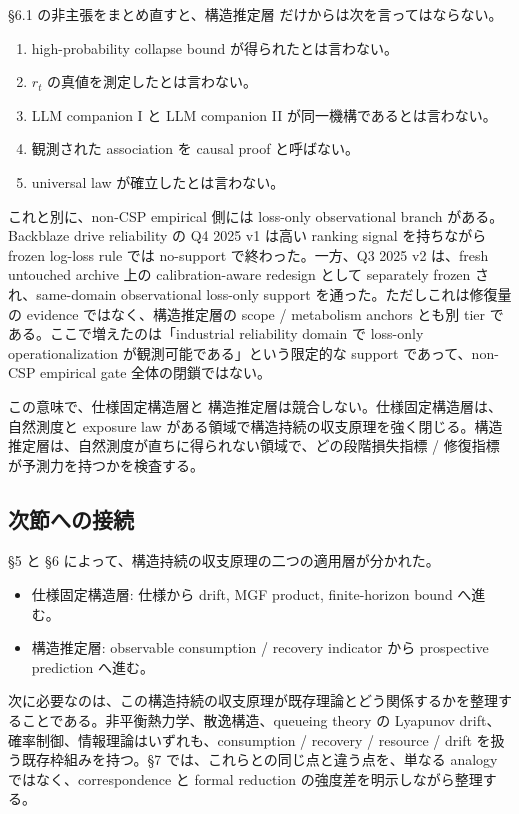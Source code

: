 \documentclass[12pt,a4paper]{article}
\begin{document}
§6.1 の非主張をまとめ直すと、構造推定層 だけからは次を言ってはならない。

\begin{enumerate}
\def\labelenumi{\arabic{enumi}.}
\tightlist
\item
  high-probability collapse bound が得られたとは言わない。
\item
  \(r_{t}\) の真値を測定したとは言わない。
\item
  LLM companion I と LLM companion II が同一機構であるとは言わない。
\item
  観測された association を causal proof と呼ばない。
\item
  universal law が確立したとは言わない。
\end{enumerate}

これと別に、non-CSP empirical 側には loss-only observational branch がある。Backblaze drive reliability の Q4 2025 v1 は高い ranking signal を持ちながら frozen log-loss rule では no-support で終わった。一方、Q3 2025 v2 は、fresh untouched archive 上の calibration-aware redesign として separately frozen され、same-domain observational loss-only support を通った。ただしこれは修復量の evidence ではなく、構造推定層の scope / metabolism anchors とも別 tier である。ここで増えたのは「industrial reliability domain で loss-only operationalization が観測可能である」という限定的な support であって、non-CSP empirical gate 全体の閉鎖ではない。

この意味で、仕様固定構造層と 構造推定層は競合しない。仕様固定構造層は、自然測度と exposure law がある領域で構造持続の収支原理を強く閉じる。構造推定層は、自然測度が直ちに得られない領域で、どの段階損失指標 / 修復指標が予測力を持つかを検査する。

\subsection{次節への接続}\label{ux6b21ux7bc0ux3078ux306eux63a5ux7d9a-2}

§5 と §6 によって、構造持続の収支原理の二つの適用層が分かれた。

\begin{itemize}
\tightlist
\item
  仕様固定構造層: 仕様から drift, MGF product, finite-horizon bound へ進む。
\item
  構造推定層: observable consumption / recovery indicator から prospective prediction へ進む。
\end{itemize}

次に必要なのは、この構造持続の収支原理が既存理論とどう関係するかを整理することである。非平衡熱力学、散逸構造、queueing theory の Lyapunov drift、確率制御、情報理論はいずれも、consumption / recovery / resource / drift を扱う既存枠組みを持つ。§7 では、これらとの同じ点と違う点を、単なる analogy ではなく、correspondence と formal reduction の強度差を明示しながら整理する。
\end{document}
